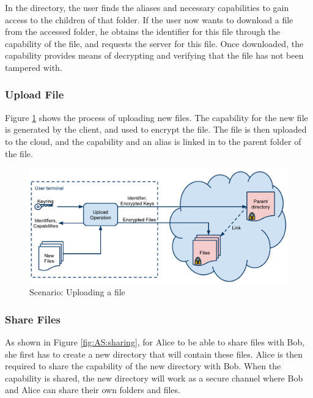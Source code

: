 \documentclass[pdftex,english,10pt,b5paper,twoside]{book}
\begin{document}
In the directory, the user finds the aliases and necessary capabilities to gain
access to the children of that folder. If the user now wants to download a file
from the accessed folder, he obtains the identifier for this file through the
capability of the file, and requests the server for this file. Once downloaded,
the capability provides means of decrypting and verifying that the file has not
been tampered with.

\subsubsection{Upload File}

Figure \ref{fig:AS:upload} shows the process of uploading new files. The
capability for the new file is generated by the client, and used to encrypt the
file. The file is then uploaded to the cloud, and the capability and an alias
is linked in to the parent folder of the file.

\begin{figure}[h!]
    \centering
    \includegraphics[width=\columnwidth]{ArchitectureUpload.pdf}
    \caption{Scenario: Uploading a file}
    \label{fig:AS:upload}
\end{figure}

\subsubsection{Share Files}

As shown in Figure \ref{fig:AS:sharing}, for Alice to be able to share files
with Bob, she first has to create a new directory that will contain these
files. Alice is then required to share the capability of the new directory with
Bob. When the capability is shared, the new directory will work as a secure
channel where Bob and Alice can share their own folders and files.
\end{document}
